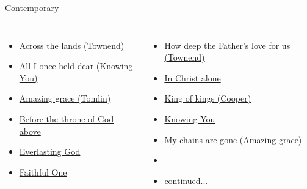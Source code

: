 \documentclass{beamer}
\begin{document}
\begin{frame}{Contemporary}
\begin{columns}
        \begin{itemize}
    \item \hyperlink{Across the lands["You're the Word of God the Father"](Townend)}{Across the lands (Townend)} \phantom{ 1 1 1 1 1}
    \item \hyperlink{Knowing You['All I once held dear']}{All I once held dear (Knowing You)} \phantom{ 1}
    \item \hyperlink{Amazing grace['My chains are gone'](Tomlin)}{Amazing grace (Tomlin)} \phantom{ 1 1 1 1 1 1 1}
    \item \hyperlink{Before the throne of God above[]}{Before the throne of God above } \phantom{ 1 1}
    \item \hyperlink{Everlasting God['Strength will rise']}{Everlasting God } \phantom{ 1 1 1 1 1 1 1 1 1 1}
    \item \hyperlink{Faithful One[]}{Faithful One } \phantom{ 1 1 1 1 1 1 1 1 1 1 1}
\end{itemize}
        \begin{itemize}
                                            \item \hyperlink{How deep the Father's love for us[](Townend)}{How deep the Father's love for us (Townend)} \phantom{}
                    \item \hyperlink{In Christ alone[]}{In Christ alone } \phantom{ 1 1 1 1 1 1 1 1 1 1}
    \item \hyperlink{King of kings[](Cooper)}{King of kings (Cooper)} \phantom{ 1 1 1 1 1 1 1}
    \item \hyperlink{Knowing You['All I once held dear']}{Knowing You } \phantom{ 1 1 1 1 1 1 1 1 1 1 1 1}
            \item \hyperlink{Amazing grace['My chains are gone'](Tomlin)}{My chains are gone (Amazing grace)} \phantom{ 1}
    \item[] \phantom{1}    \item[] continued...
            \end{itemize}
            \end{columns}
            \end{frame}
\end{document}
